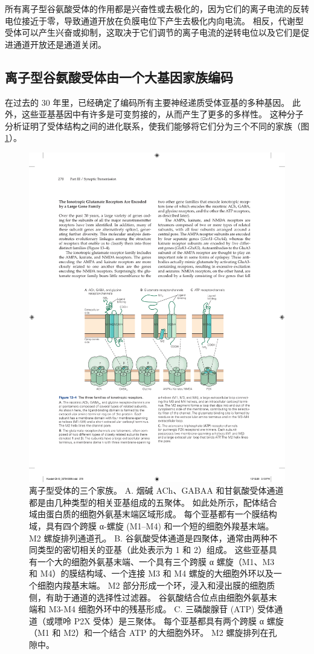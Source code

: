 所有离子型谷氨酸受体的作用都是兴奋性或去极化的，因为它们的离子电流的反转电位接近于零，导致通道开放在负膜电位下产生去极化内向电流。
相反，代谢型受体可以产生兴奋或抑制，这取决于它们调节的离子电流的逆转电位以及它们是促进通道开放还是通道关闭。



\subsection{离子型谷氨酸受体由一个大基因家族编码}

在过去的 30 年里，已经确定了编码所有主要神经递质受体亚基的多种基因。 
此外，这些亚基基因中有许多是可变剪接的，从而产生了更多的多样性。 
这种分子分析证明了受体结构之间的进化联系，使我们能够将它们分为三个不同的家族（图 \ref{fig:13_4}）。

\begin{figure}[htbp]
	\centering
	\includegraphics[width=0.75\linewidth]{chap13/fig_13_4}
	\caption{离子型受体的三个家族。 A. 烟碱 ACh、GABAA 和甘氨酸受体通道都是由几种类型的相关亚基组成的五聚体。 如此处所示，配体结合域由蛋白质的细胞外氨基末端区域形成。 每个亚基都有一个膜结构域，具有四个跨膜 α-螺旋 (M1–M4) 和一个短的细胞外羧基末端。 M2 螺旋排列通道孔。 B. 谷氨酸受体通道是四聚体，通常由两种不同类型的密切相关的亚基（此处表示为 1 和 2）组成。 这些亚基具有一个大的细胞外氨基末端、一个具有三个跨膜 α 螺旋（M1、M3 和 M4）的膜结构域、一个连接 M3 和 M4 螺旋的大细胞外环以及一个细胞内羧基末端。 M2 部分形成一个环，浸入和浸出膜的细胞质侧，有助于通道的选择性过滤器。 谷氨酸结合位点由细胞外氨基末端和 M3-M4 细胞外环中的残基形成。 C. 三磷酸腺苷 (ATP) 受体通道（或嘌呤 P2X 受体）是三聚体。 每个亚基都具有两个跨膜 α 螺旋（M1 和 M2）和一个结合 ATP 的大细胞外环。 M2 螺旋排列在孔隙中。}
	\label{fig:13_4}
\end{figure}


